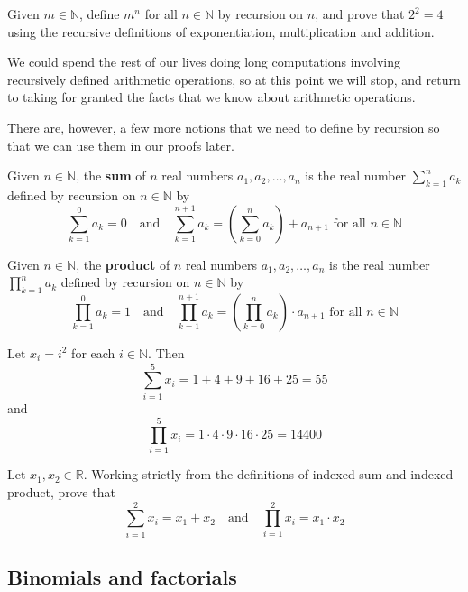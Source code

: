 \begin{exercise}
Given $m \in \mathbb{N}$, define $m^n$ for all $n \in \mathbb{N}$ by recursion on $n$, and prove that $2^2 = 4$ using the recursive definitions of exponentiation, multiplication and addition.
\end{exercise}

We could spend the rest of our lives doing long computations involving recursively defined arithmetic operations, so at this point we will stop, and return to taking for granted the facts that we know about arithmetic operations.

There are, however, a few more notions that we need to define by recursion so that we can use them in our proofs later.

\begin{definition}
\label{defSumOfRealNumbers}
Given $n \in \mathbb{N}$, the \textbf{sum} of $n$ real numbers $a_1, a_2, \dots, a_n$ is the real number $\sum_{k=1}^n a_k$ defined by recursion on $n \in \mathbb{N}$ by
\[ \sum_{k=1}^0 a_k = 0 \quad \text{and} \quad \sum_{k=1}^{n+1} a_k = \left( \sum_{k=0}^n a_k \right) + a_{n+1} \text{ for all } n \in \mathbb{N} \]
\end{definition}

\begin{definition}
\label{defProductOfRealNumbers}
Given $n \in \mathbb{N}$, the \textbf{product} of $n$ real numbers $a_1, a_2, \dots, a_n$ is the real number $\prod_{k=1}^n a_k$ defined by recursion on $n \in \mathbb{N}$ by
\[ \prod_{k=1}^0 a_k = 1 \quad \text{and} \quad \prod_{k=1}^{n+1} a_k = \left( \prod_{k=0}^n a_k \right) \cdot a_{n+1} \text{ for all } n \in \mathbb{N} \]
\end{definition}

\begin{example}
Let $x_i=i^2$ for each $i \in \mathbb{N}$. Then
\[ \sum_{i=1}^5 x_i = 1 + 4 + 9 + 16 + 25 = 55 \]
and
\[ \prod_{i=1}^5 x_i = 1 \cdot 4 \cdot 9 \cdot 16 \cdot 25 = 14400 \]
\end{example}

\begin{exercise}
Let $x_1, x_2 \in \mathbb{R}$. Working strictly from the definitions of indexed sum and indexed product, prove that
\[ \sum_{i=1}^2 x_i = x_1 + x_2 \quad \text{and} \quad \prod_{i=1}^2 x_i = x_1 \cdot x_2 \]
\end{exercise}

\subsection*{Binomials and factorials}

